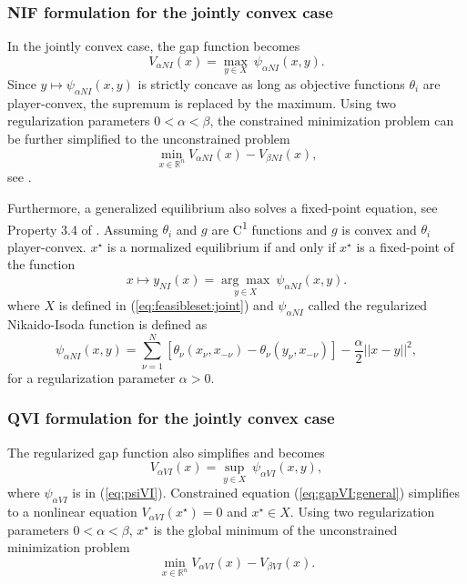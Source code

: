 \documentclass[11pt, a4paper]{article}
\newcommand{\expo}{\textsuperscript}
\newcommand{\R}{\ensuremath{\mathbb{R}}}
\begin{document}
\subsubsection{NIF formulation for the jointly convex case}

In the jointly convex case, the gap function becomes
$$
V_{\alpha NI}(x)= \underset{ y \in X }{\max}~ \psi_{\alpha NI}(x,y).
$$
Since $y\mapsto \psi_{\alpha NI}(x,y)$ is strictly concave as long as objective functions $\theta_i$ are player-convex, the supremum is replaced by the maximum. 
Using two regularization parameters $0<\alpha<\beta$, the constrained minimization problem can be further simplified to the unconstrained problem
\begin{equation}
\underset{x\in\R^n}{\min} V_{\alpha NI}(x)-V_{\beta NI}(x),
\label{eq:gapNIab:joint}
\end{equation}
see \cite{heusingerkanzow}.


Furthermore, a generalized equilibrium also solves a fixed-point equation, see Property 3.4 of \cite{heusingerkanzow}.
Assuming $\theta_i$ and $g$ are C\expo{1} functions and $g$ is convex and $\theta_i$ player-convex. $x^\star$ is a normalized equilibrium if and only if $x^\star$ is a fixed-point of the function
\begin{equation}
x \mapsto y_{NI}(x) = \underset{y\in X}{\arg\max}~ \psi_{\alpha NI}(x, y).
\label{eq:fpNIa:joint}
\end{equation}
where $X$ is defined in (\ref{eq:feasibleset:joint}) and $\psi_{\alpha NI}$ called the regularized Nikaido-Isoda function is defined as
\begin{equation}
\psi_{\alpha NI}(x, y) = \sum_{\nu = 1}^N [ \theta_\nu(x_\nu, x_{-\nu}) -  \theta_\nu(y_\nu, x_{-\nu}) ] - \frac{\alpha}{2} ||x-y||^2,
\label{eq:psiregNI}
\end{equation}
for a regularization parameter $\alpha>0$.

\subsubsection{QVI formulation for the jointly convex case}

The regularized gap function also simplifies and becomes
$$
V_{\alpha VI}(x) = \underset{y\in X}{\sup}~\psi_{\alpha VI}(x, y),
$$
where $\psi_{\alpha VI}$ is in (\ref{eq:psiVI}).
Constrained equation (\ref{eq:gapVI:general}) simplifies to a nonlinear equation
$V_{\alpha VI}(x^\star)=0$ and $x^\star \in X$.
Using two regularization parameters $0<\alpha<\beta$, $x^\star$ is the global minimum of the unconstrained minimization problem 
\begin{equation}
\underset{x\in\R^n}{\min} V_{\alpha VI}(x)-V_{\beta VI}(x).
\label{eq:gapVIab:joint}
\end{equation}
\end{document}
